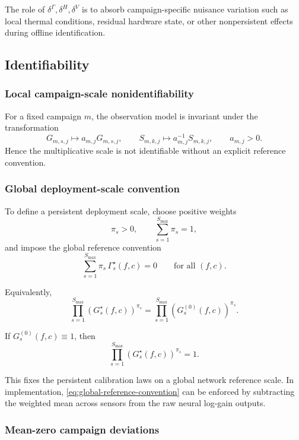 The role of $\delta^\Gamma,\delta^H,\delta^V$ is to absorb campaign-specific
nuisance variation such as local thermal conditions, residual hardware state,
or other nonpersistent effects during offline identification.

\subsection{Identifiability}

\subsubsection{Local campaign-scale nonidentifiability}

For a fixed campaign $m$, the observation model is invariant under the
transformation
\[
G_{m,s,j}\mapsto a_{m,j}G_{m,s,j},
\qquad
S_{m,k,j}\mapsto a_{m,j}^{-1}S_{m,k,j},
\qquad
a_{m,j}>0.
\]
Hence the multiplicative scale is not identifiable without an explicit
reference convention.

\subsubsection{Global deployment-scale convention}

To define a persistent deployment scale, choose positive weights
\[
\pi_s>0,
\qquad
\sum_{s=1}^{S_{\max}}\pi_s=1,
\]
and impose the global reference convention
\begin{equation}
\sum_{s=1}^{S_{\max}}
\pi_s\,\Gamma_s^\star(f,c)=0
\qquad
\text{for all }(f,c).
\label{eq:global-reference-convention}
\end{equation}

Equivalently,
\[
\prod_{s=1}^{S_{\max}}
\left(
G_s^\star(f,c)
\right)^{\pi_s}
=
\prod_{s=1}^{S_{\max}}
\left(
G_s^{(0)}(f,c)
\right)^{\pi_s}.
\]

If $G_s^{(0)}(f,c)\equiv 1$, then
\begin{equation}
\prod_{s=1}^{S_{\max}}
\left(
G_s^\star(f,c)
\right)^{\pi_s}
=
1.
\label{eq:geom-mean-one-global}
\end{equation}

This fixes the persistent calibration laws on a global network reference
scale. In implementation, \eqref{eq:global-reference-convention} can be
enforced by subtracting the weighted mean across sensors from the raw neural
log-gain outputs.

\subsubsection{Mean-zero campaign deviations}

